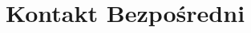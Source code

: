 \documentclass[a4paper,12pt]{article}
\begin{document}
\title{Kontakt Bezpośredni}
\maketitle
	
\end{document}
